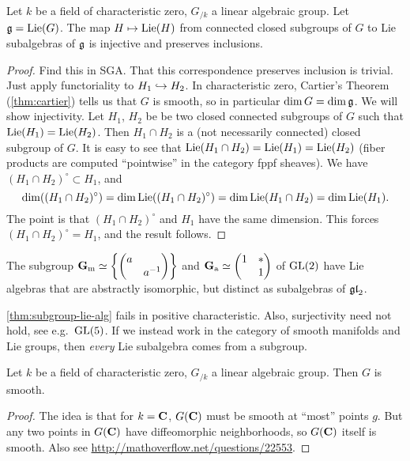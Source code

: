 \begin{theorem}\label{thm:subgroup-lie-alg}
Let $k$ be a field of characteristic zero, $G_{/k}$ a linear algebraic group. 
Let $\mathfrak{g}=\operatorname{Lie}(G)$. The map $H\mapsto \operatorname{Lie}(H)$ from connected closed subgroups 
of $G$ to Lie subalgebras of $\mathfrak{g}$ is injective and preserves inclusions. 
\end{theorem}
\begin{proof}
Find this in SGA. That this correspondence preserves inclusion is trivial. Just 
apply functoriality to $H_1\hookrightarrow H_2$. In characteristic zero, Cartier's 
Theorem (\autoref{thm:cartier}) tells us that $G$ is smooth, so in particular 
$\dim G=\dim \mathfrak{g}$. We will show injectivity. Let $H_1$, $H_2$ be be two closed 
connected subgroups of $G$ such that $\operatorname{Lie}(H_1)=\operatorname{Lie}(H_2)$. Then $H_1\cap H_2$ 
is a (not necessarily connected) closed subgroup of $G$. It is easy to see that 
$\operatorname{Lie}(H_1\cap H_2)=\operatorname{Lie}(H_1)=\operatorname{Lie}(H_2)$ (fiber products are computed 
``pointwise'' in the category fppf sheaves). We have 
$(H_1\cap H_2)^\circ\subset H_1$, and 
\[
  \dim((H_1\cap H_2)^\circ)=\dim \operatorname{Lie}((H_1\cap H_2)^\circ) = \dim \operatorname{Lie}(H_1\cap H_2) =\dim\operatorname{Lie}(H_1) .
\]
The point is that $(H_1\cap H_2)^\circ$ and $H_1$ have the same dimension. 
This forces $(H_1\cap H_2)^\circ=H_1$, and the result follows. 
\end{proof}

\begin{example}
The subgroup 
$\mathbf{G}_\mathrm{m}\simeq \left\{\begin{pmatrix} a \\ & a^{-1} \end{pmatrix}\right\}$ 
and $\mathbf{G}_\mathrm{a}\simeq \begin{pmatrix} 1 & \ast \\ & 1 \end{pmatrix}$ of $\operatorname{GL}(2)$ have 
Lie algebras that are abstractly isomorphic, but distinct as subalgebras of 
$\mathfrak{gl}_2$. 
\end{example}

\autoref{thm:subgroup-lie-alg} fails in positive characteristic. Also, 
surjectivity need not hold, see e.g.~$\operatorname{GL}(5)$. If we instead work in the 
category of smooth manifolds and Lie groups, then \emph{every} Lie subalgebra 
comes from a subgroup. 

\begin{theorem}[Cartier]\label{thm:cartier}
Let $k$ be a field of characteristic zero, $G_{/k}$ a linear algebraic group. 
Then $G$ is smooth. 
\end{theorem}
\begin{proof}
The idea is that for $k=\mathbf{C}$, $G(\mathbf{C})$ must be smooth at ``most'' points 
$g$. But any two points in $G(\mathbf{C})$ have diffeomorphic neighborhoods, so 
$G(\mathbf{C})$ itself is smooth. Also see \url{http://mathoverflow.net/questions/22553}. 
\end{proof}

